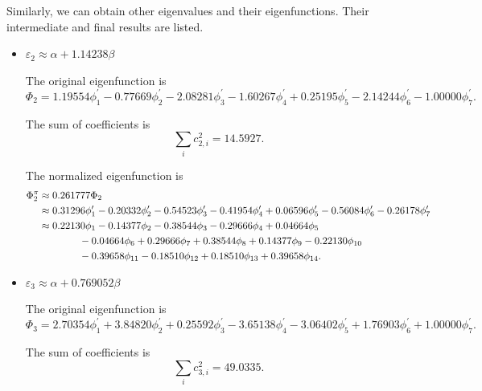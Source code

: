 		Similarly, we can obtain other eigenvalues and their eigenfunctions. Their intermediate and final results are listed.
		\begin{itemize}
		
		
		\item $\varepsilon_2 \approx \alpha + 1.14238 \beta$
		
		The original eigenfunction is
		\begin{equation*}
			\Phi_2 = 1.19554 \phi^\prime_1 - 0.77669 \phi^\prime_2 -2.08281 \phi^\prime_3 -1.60267 \phi^\prime_4 +0.25195 \phi^\prime_5 - 2.14244 \phi^\prime_6 - 1.00000 \phi^\prime_7.
		\end{equation*}
		
		The sum of coefficients is
		\begin{equation*}
			\sum_{i} c^2_{2,i} = 14.5927.
		\end{equation*}

		The normalized eigenfunction is
		\begin{align}
			\Phi^\pi_2 &\approx 0.261777 \Phi_2 \notag \\
			&\approx 0.31296 \phi^\prime_1 - 0.20332 \phi^\prime_2 -0.54523 \phi^\prime_3 -0.41954 \phi^\prime_4 + 0.06596 \phi^\prime_5 - 0.56084 \phi^\prime_6 - 0.26178 \phi^\prime_7 \notag \\
			&\approx 0.22130 \phi_1 -0.14377 \phi_2 -0.38544 \phi_3 -0.29666 \phi_4 + 0.04664 \phi_5  \notag \\
			&\hspace*{4em} - 0.04664\phi_6 +0.29666 \phi_7 +0.38544 \phi_8 +0.14377 \phi_9  -0.22130 \phi_{10} \notag \\
			&\hspace*{4em}- 0.39658 \phi_{11} - 0.18510 \phi_{12} + 0.18510 \phi_{13} + 0.39658 \phi_{14} .
		\end{align}
		
		
		\item $\varepsilon_3 \approx \alpha + 0.769052 \beta$
		
		The original eigenfunction is
		\begin{equation*}
			\Phi_3 = 2.70354 \phi^\prime_1 + 3.84820 \phi^\prime_2 +0.25592 \phi^\prime_3 -3.65138 \phi^\prime_4 - 3.06402 \phi^\prime_5 + 1.76903 \phi^\prime_6 + 1.00000 \phi^\prime_7.
		\end{equation*}
		
		The sum of coefficients is
		\begin{equation*}
			\sum_{i} c^2_{3,i} = 49.0335.
		\end{equation*}
		

\end{itemize}
